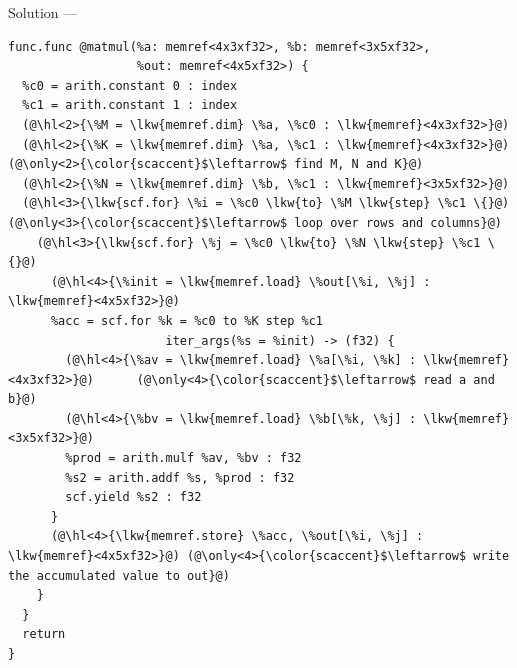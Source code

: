 \documentclass[aspectratio=169,10pt]{beamer}
\begin{document}
\begin{frame}[fragile]{Solution --- }
\begin{lstlisting}[language=mlir]
func.func @matmul(%a: memref<4x3xf32>, %b: memref<3x5xf32>,
                  %out: memref<4x5xf32>) {
  %c0 = arith.constant 0 : index
  %c1 = arith.constant 1 : index
  (@\hl<2>{\%M = \lkw{memref.dim} \%a, \%c0 : \lkw{memref}<4x3xf32>}@)
  (@\hl<2>{\%K = \lkw{memref.dim} \%a, \%c1 : \lkw{memref}<4x3xf32>}@)                 (@\only<2>{\color{scaccent}$\leftarrow$ find M, N and K}@)
  (@\hl<2>{\%N = \lkw{memref.dim} \%b, \%c1 : \lkw{memref}<3x5xf32>}@)
  (@\hl<3>{\lkw{scf.for} \%i = \%c0 \lkw{to} \%M \lkw{step} \%c1 \{}@)                         (@\only<3>{\color{scaccent}$\leftarrow$ loop over rows and columns}@)
    (@\hl<3>{\lkw{scf.for} \%j = \%c0 \lkw{to} \%N \lkw{step} \%c1 \{}@)
      (@\hl<4>{\%init = \lkw{memref.load} \%out[\%i, \%j] : \lkw{memref}<4x5xf32>}@)
      %acc = scf.for %k = %c0 to %K step %c1
                      iter_args(%s = %init) -> (f32) {
        (@\hl<4>{\%av = \lkw{memref.load} \%a[\%i, \%k] : \lkw{memref}<4x3xf32>}@)      (@\only<4>{\color{scaccent}$\leftarrow$ read a and b}@)
        (@\hl<4>{\%bv = \lkw{memref.load} \%b[\%k, \%j] : \lkw{memref}<3x5xf32>}@)
        %prod = arith.mulf %av, %bv : f32
        %s2 = arith.addf %s, %prod : f32
        scf.yield %s2 : f32
      }
      (@\hl<4>{\lkw{memref.store} \%acc, \%out[\%i, \%j] : \lkw{memref}<4x5xf32>}@) (@\only<4>{\color{scaccent}$\leftarrow$ write the accumulated value to out}@)
    }
  }
  return
}
\end{lstlisting}
\end{frame}
\end{document}
